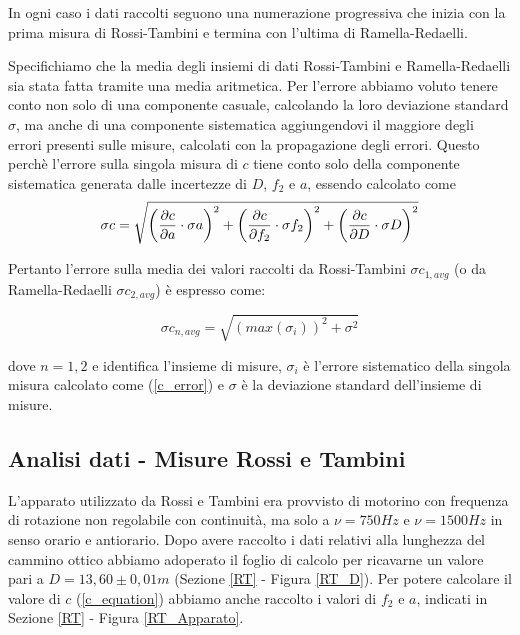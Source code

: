 \documentclass{article}
\begin{document}
In ogni caso i dati raccolti seguono una numerazione progressiva che inizia con la prima misura di Rossi-Tambini e termina con l'ultima di Ramella-Redaelli.

Specifichiamo che la media degli insiemi di dati Rossi-Tambini e Ramella-Redaelli sia stata fatta tramite una media aritmetica. Per l'errore
abbiamo voluto tenere conto non solo di una componente casuale, calcolando la loro deviazione standard $\sigma$, ma anche di una componente sistematica aggiungendovi
il maggiore degli errori presenti sulle misure, calcolati con la propagazione degli errori.
Questo perchè l'errore sulla singola misura di $c$ tiene conto solo della componente sistematica generata dalle incertezze di $D$, $f_2$ e $a$, essendo calcolato come
\begin{equation}
    \centering
    \sigma c = \sqrt{\bigg(\frac{\partial c}{\partial a}\cdot \sigma a\bigg)^2 + \bigg(\frac{\partial c}{\partial f_2}\cdot \sigma f_2 \bigg)^2 + \bigg(\frac{\partial c}{\partial D}\cdot \sigma D \bigg)^2} 
    \label{c_error}
\end{equation}

Pertanto l'errore sulla media dei valori raccolti da Rossi-Tambini $\sigma c_{1,avg}$ (o da Ramella-Redaelli $\sigma c_{2,avg}$) è espresso come:

\begin{equation}
    \sigma c_{n,avg} =\sqrt{(max(\sigma_{i}))^2+\sigma^2}
    \label{c_Errore}
\end{equation}

dove $n=1,2$ e identifica l'insieme di misure, $\sigma_{i}$ è l'errore sistematico della singola misura calcolato come (\ref{c_error}) e $\sigma$ è la deviazione standard dell'insieme di misure.



\subsection{Analisi dati - Misure Rossi e Tambini} \label{DataAnalysis_RT}

L'apparato utilizzato da Rossi e Tambini era provvisto di motorino con frequenza di rotazione non regolabile con continuità, ma solo a $\nu=750Hz$ e $\nu=1500Hz$
in senso orario e antiorario. Dopo avere raccolto i dati relativi alla lunghezza del cammino ottico abbiamo adoperato il foglio di calcolo per ricavarne un valore pari 
a $D = 13,60 \pm 0,01 m$ (Sezione \ref{RT} - Figura \ref{RT_D}). Per potere calcolare il valore di $c$ (\ref{c_equation}) abbiamo anche raccolto i valori di $f_2$ e $a$,
indicati in Sezione \ref{RT} - Figura \ref{RT_Apparato}.
\end{document}
